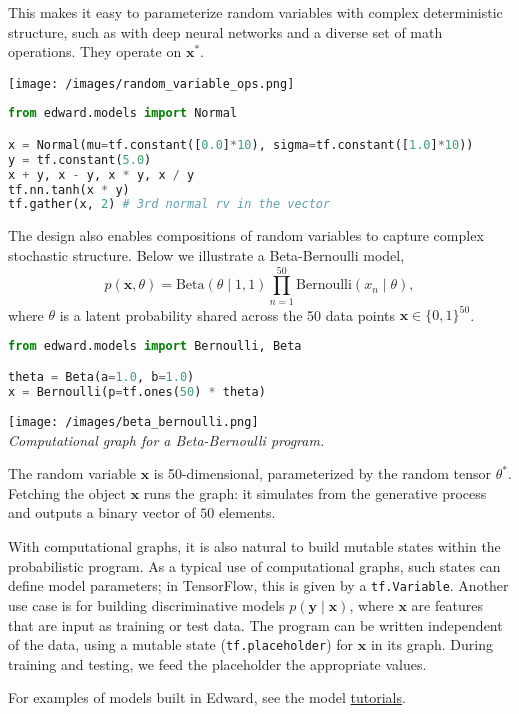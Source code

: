 This makes it easy to parameterize random variables with complex deterministic
structure, such as with deep neural networks and a diverse set of math
operations.
They operate on $\mathbf{x}^*$.

\texttt{[image: /images/random\_variable\_ops.png]}

\begin{lstlisting}[language=Python]
from edward.models import Normal

x = Normal(mu=tf.constant([0.0]*10), sigma=tf.constant([1.0]*10))
y = tf.constant(5.0)
x + y, x - y, x * y, x / y
tf.nn.tanh(x * y)
tf.gather(x, 2) # 3rd normal rv in the vector
\end{lstlisting}

The design also enables compositions of random variables
to capture complex stochastic structure.
%
Below we illustrate a Beta-Bernoulli model,
\begin{equation*}
p(\mathbf{x}, \theta) =
\text{Beta}(\theta\mid 1, 1)
\prod_{n=1}^{50} \text{Bernoulli}(x_n\mid \theta),
\end{equation*}
where $\theta$
is a latent probability shared across the 50 data points $\mathbf{x}\in\{0,1\}^{50}$.

\begin{lstlisting}[language=python]
from edward.models import Bernoulli, Beta

theta = Beta(a=1.0, b=1.0)
x = Bernoulli(p=tf.ones(50) * theta)
\end{lstlisting}

\texttt{[image: /images/beta\_bernoulli.png]} \\
{\small\textit{%
Computational graph for a Beta-Bernoulli program.
}}

The random variable $\mathbf{x}$ is 50-dimensional, parameterized by the
random tensor $\theta^*$. Fetching the object $\mathbf{x}$ runs the
graph: it simulates from the generative process and
outputs a binary vector of $50$ elements.

With computational graphs, it is also natural to build mutable states
within the probabilistic program. As a typical use of computational
graphs, such states can define model parameters; in TensorFlow, this
is given by a \texttt{tf.Variable}. Another use case is for building
discriminative models $p(\mathbf{y}\mid\mathbf{x})$, where
$\mathbf{x}$ are features that are input as training or test data.  The
program can be written independent of the data, using a mutable state
(\texttt{tf.placeholder}) for $\mathbf{x}$ in its graph.
During training and testing, we feed the placeholder the appropriate
values.

For examples of models built in Edward, see the model
\href{/tutorials/}{tutorials}.
